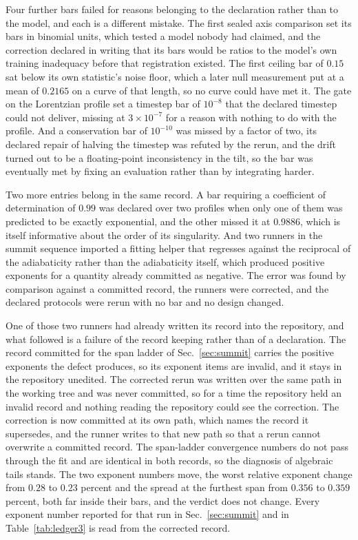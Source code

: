 \documentclass[aps,pre,reprint,nofootinbib,floatfix]{revtex4-2}
\begin{document}
Four further bars failed for reasons belonging to the declaration
rather than to the model, and each is a different mistake.  The first
sealed axis comparison set its bars in binomial units, which tested a
model nobody had claimed, and the correction declared in writing that
its bars would be ratios to the model's own training inadequacy before
that registration existed.  The first ceiling bar of $0.15$ sat below
its own statistic's noise floor, which a later null measurement put at
a mean of $0.2165$ on a curve of that length, so no curve could have
met it.  The gate on the Lorentzian profile set a timestep bar of
$10^{-8}$ that the declared timestep could not deliver, missing at
$3 \times 10^{-7}$ for a reason with nothing to do with the profile.
And a conservation bar of $10^{-10}$ was missed by a factor of two,
its declared repair of halving the timestep was refuted by the rerun,
and the drift turned out to be a floating-point inconsistency in the
tilt, so the bar was eventually met by fixing an evaluation rather than
by integrating harder.

Two more entries belong in the same record.  A bar requiring a
coefficient of determination of $0.99$ was declared over two profiles
when only one of them was predicted to be exactly exponential, and the
other missed it at $0.9886$, which is itself informative about the
order of its singularity.  And two runners in the summit sequence
imported a fitting helper that regresses against the reciprocal of the
adiabaticity rather than the adiabaticity itself, which produced
positive exponents for a quantity already committed as negative.  The
error was found by comparison against a committed record, the runners
were corrected, and the declared protocols were rerun with no bar and
no design changed.

One of those two runners had already written its record into the
repository, and what followed is a failure of the record keeping rather
than of a declaration.  The record committed for the span ladder of
Sec.~\ref{sec:summit} carries the positive exponents the defect
produces, so its exponent items are invalid, and it stays in the
repository unedited.  The corrected rerun was written over the same
path in the working tree and was never committed, so for a time the
repository held an invalid record and nothing reading the repository
could see the correction.  The correction is now committed at its own
path, which names the record it supersedes, and the runner writes to
that new path so that a rerun cannot overwrite a committed record.  The
span-ladder convergence numbers do not pass through the fit and are
identical in both records, so the diagnosis of algebraic tails stands.
The two exponent numbers move, the worst relative exponent change from
$0.28$ to $0.23$ percent and the spread at the furthest span from
$0.356$ to $0.359$ percent, both far inside their bars, and the verdict
does not change.  Every exponent number reported for that run in
Sec.~\ref{sec:summit} and in Table~\ref{tab:ledger3} is read from the
corrected record.
\end{document}
